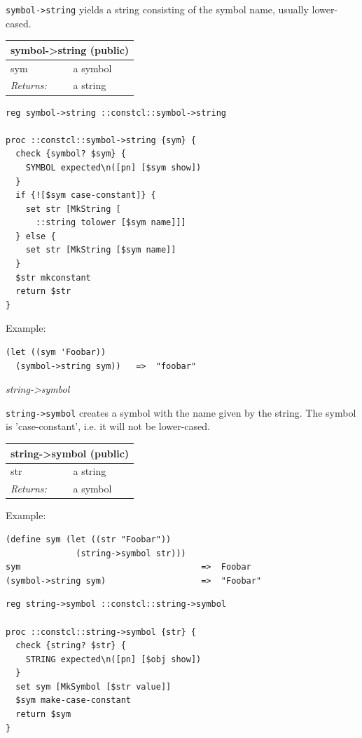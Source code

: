 \documentclass[twoside,9pt]{report}
\begin{document}
\texttt{symbol->string} yields a string consisting of the symbol name, usually lower-cased.

\begin{tabular}{ |l l| }
\hline
\multicolumn{2}{|l|}{symbol->string (public)} \\
\hline
sym & a symbol \\
\textit{Returns:} & a string \\
\hline
\end{tabular}

\noindent\makebox[\linewidth]{\rule{\linewidth}{0.4pt}}
\begin{lstlisting}
reg symbol->string ::constcl::symbol->string
 
proc ::constcl::symbol->string {sym} {
  check {symbol? $sym} {
    SYMBOL expected\n([pn] [$sym show])
  }
  if {![$sym case-constant]} {
    set str [MkString [
      ::string tolower [$sym name]]]
  } else {
    set str [MkString [$sym name]]
  }
  $str mkconstant
  return $str
}
\end{lstlisting}
\noindent\makebox[\linewidth]{\rule{\linewidth}{0.4pt}}

Example:

\noindent\makebox[\linewidth]{\rule{\linewidth}{0.4pt}}
\begin{lstlisting}
(let ((sym 'Foobar))
  (symbol->string sym))   =>  "foobar"
\end{lstlisting}
\noindent\makebox[\linewidth]{\rule{\linewidth}{0.4pt}}

\emph{string->symbol}


\texttt{string->symbol} creates a symbol with the name given by the string. The symbol is 'case-constant', i.e. it will not be lower-cased.

\begin{tabular}{ |l l| }
\hline
\multicolumn{2}{|l|}{string->symbol (public)} \\
\hline
str & a string \\
\textit{Returns:} & a symbol \\
\hline
\end{tabular}


Example:

\noindent\makebox[\linewidth]{\rule{\linewidth}{0.4pt}}
\begin{lstlisting}
(define sym (let ((str "Foobar"))
              (string->symbol str)))
sym                                    =>  Foobar
(symbol->string sym)                   =>  "Foobar"
\end{lstlisting}
\noindent\makebox[\linewidth]{\rule{\linewidth}{0.4pt}}
\noindent\makebox[\linewidth]{\rule{\linewidth}{0.4pt}}
\begin{lstlisting}
reg string->symbol ::constcl::string->symbol
 
proc ::constcl::string->symbol {str} {
  check {string? $str} {
    STRING expected\n([pn] [$obj show])
  }
  set sym [MkSymbol [$str value]]
  $sym make-case-constant
  return $sym
}
\end{lstlisting}
\noindent\makebox[\linewidth]{\rule{\linewidth}{0.4pt}}
\end{document}
